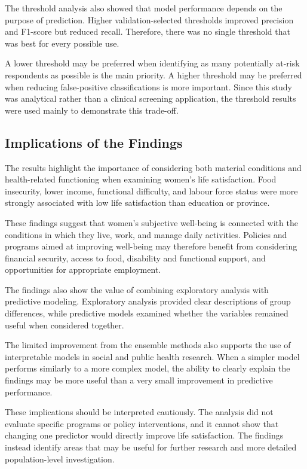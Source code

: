 \documentclass[12pt]{article}
\begin{document}
The threshold analysis also showed that model performance depends on the purpose of prediction. Higher validation-selected thresholds improved precision and F1-score but reduced recall. Therefore, there was no single threshold that was best for every possible use.

A lower threshold may be preferred when identifying as many potentially at-risk respondents as possible is the main priority. A higher threshold may be preferred when reducing false-positive classifications is more important. Since this study was analytical rather than a clinical screening application, the threshold results were used mainly to demonstrate this trade-off.

\subsection{Implications of the Findings}

The results highlight the importance of considering both material conditions and health-related functioning when examining women's life satisfaction. Food insecurity, lower income, functional difficulty, and labour force status were more strongly associated with low life satisfaction than education or province.

These findings suggest that women's subjective well-being is connected with the conditions in which they live, work, and manage daily activities. Policies and programs aimed at improving well-being may therefore benefit from considering financial security, access to food, disability and functional support, and opportunities for appropriate employment.

The findings also show the value of combining exploratory analysis with predictive modeling. Exploratory analysis provided clear descriptions of group differences, while predictive models examined whether the variables remained useful when considered together.

The limited improvement from the ensemble methods also supports the use of interpretable models in social and public health research. When a simpler model performs similarly to a more complex model, the ability to clearly explain the findings may be more useful than a very small improvement in predictive performance.

These implications should be interpreted cautiously. The analysis did not evaluate specific programs or policy interventions, and it cannot show that changing one predictor would directly improve life satisfaction. The findings instead identify areas that may be useful for further research and more detailed population-level investigation.
\end{document}
